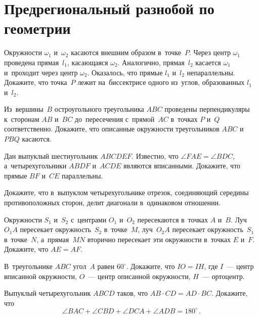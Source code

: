 
\section*{Предрегиональный разнобой по геометрии}


\begin{problems}

\item
Окружности $\omega_1$ и~$\omega_2$ касаются внешним образом в~точке~$P$.
Через центр $\omega_1$ проведена прямая~$l_1$, касающаяся $\omega_2$.
Аналогично, прямая~$l_2$ касается $\omega_1$ и~проходит через центр $\omega_2$.
Оказалось, что прямые $l_1$ и~$l_2$ непараллельны.
Докажите, что точка~$P$ лежит на~биссектрисе одного из~углов, образованных
$l_1$ и~$l_2$.

\item
Из~вершины~$B$ остроугольного треугольника $ABC$ проведены перпендикуляры
к~сторонам $AB$ и~$BC$ до~пересечения с~прямой~$AC$ в~точках $P$ и~$Q$
соответственно.
Докажите, что описанные окружности треугольников $ABC$ и~$PBQ$ касаются.

\item
Дан выпуклый шестиугольник $ABCDEF$.
Известно, что $\angle FAE = \angle BDC$, а~четырехугольники $ABDF$ и~$ACDE$
являются вписанными.
Докажите, что прямые $BF$ и~$CE$ параллельны.

\item
Докажите, что в~выпуклом четырехугольнике отрезок, соединяющий середины
противоположных сторон, делит диагонали в~одинаковом отношении.

\item
Окружности $S_1$ и~$S_2$ с~центрами $O_1$ и~$O_2$ пересекаются в~точках $A$
и~$B$.
Луч~$O_1 A$ пересекает окружность~$S_2$ в~точке~$M$, луч~$O_2 A$ пересекает
окружность~$S_1$ в~точке~$N$, а~прямая~$MN$ вторично пересекает эти окружности
в~точках $E$ и~$F$.
Докажите, что $AE = AF$.

\item
В~треугольнике $ABC$ угол~$A$ равен $60^{\circ}$.
Докажите, что $IO = IH$, где $I$~--- центр вписанной окружности, $O$~--- центр
описанной окружности, $H$~--- ортоцентр.

\item
Выпуклый четырехугольник $ABCD$ таков, что $AB \cdot CD = AD \cdot BC$.
Докажите, что
\[
    \angle BAC + \angle CBD + \angle DCA + \angle ADB
=
    180^{\circ}
\, . \]

\end{problems}

